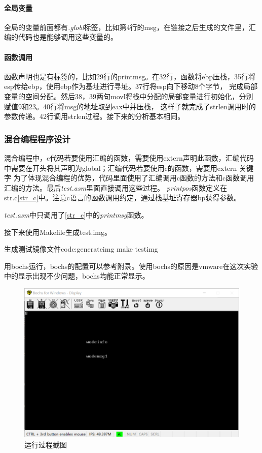 \documentclass[a4paper, 11pt]{article} %
\newcounter{code}
\begin{document}
\paragraph{全局变量}
全局的变量前面都有\textit{.globl}标签，比如第4行的msg，在链接之后生成的文件里，汇编的代码也是能够调用这些变量的。

\paragraph{函数调用}
函数声明也是有标签的，比如29行的printmsg。在32行，函数将ebp压栈，35行将esp传给ebp，使用ebp作为基址进行寻址。37行将esp向下移动8个字节，
完成局部变量的空间分配。然后38，39两句movl将栈中分配的局部变量进行初始化，分别赋值9和23。40行将msg的地址取到eax中并压栈，
这样子就完成了strlen调用时的参数传递。42行调用strlen过程。接下来的分析基本相同。

\subsubsection{混合编程程序设计}
混合编程中，c代码若要使用汇编的函数，需要使用extern声明此函数，汇编代码中需要在开头将其声明为global；汇编代码若要使用c的函数，需要用extern 关键字
为了体现混合编程的优势，代码里面使用了汇编调用c函数的方法和c函数调用汇编的方法。最后\textit{test.asm}里面直接调用这些过程。
\textit{printpos}函数定义在str.c\ref{str_c}中。注意c语言的函数调用约定，通过栈基址寄存器bp获得参数。

\textit{test.asm}中只调用了\ref{str_c}中的\textit{printmsg}函数。

接下来使用Makefile生成test.img。
\begin{code}{生成测试镜像文件}{code:generateimg}
make testimg
\end{code}

用bochs运行，bochs的配置可以参考附录。使用bochs的原因是vmware在这次实验中的显示出现不少问题，bochs均能正常显示。

\begin{figure}[H]
  \centering
  \includegraphics[width=0.8\linewidth]{mixtest.png}
  \caption{运行过程截图}
  \label{fig:mixtest}
\end{figure}
\end{document}
